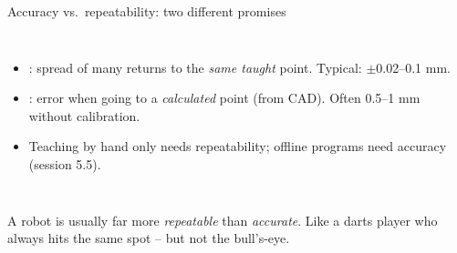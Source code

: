 \documentclass[aspectratio=169,10pt]{beamer}
\begin{document}
\begin{frame}[t]{Accuracy vs.\ repeatability: two different promises}
\begin{columns}[T,onlytextwidth]
\centering
{}
\begin{itemize}\small
\item {}: spread of many returns to the \emph{same taught} point. Typical: $\pm$0.02--0.1 mm.
\item {}: error when going to a \emph{calculated} point (from CAD). Often 0.5--1 mm without calibration.
\item Teaching by hand only needs repeatability; offline programs need accuracy (session 5.5).
\end{itemize}
\end{columns}
\vspace{1mm}
\begin{keybox}
A robot is usually far more \emph{repeatable} than \emph{accurate}. Like a darts player who always hits the same spot -- but not the bull's-eye.
\end{keybox}
\end{frame}
\end{document}
